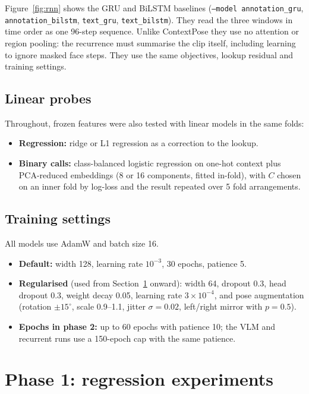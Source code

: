 \documentclass[11pt]{article}
\newcommand{\code}[1]{\texttt{#1}}
\begin{document}
Figure~\ref{fig:rnn} shows the GRU and BiLSTM baselines (\code{--model annotation\_gru}, \code{annotation\_bilstm}, \code{text\_gru}, \code{text\_bilstm}). They read the three windows in time order as one 96-step sequence. Unlike ContextPose they use no attention or region pooling: the recurrence must summarise the clip itself, including learning to ignore masked face steps. They use the same objectives, lookup residual and training settings.

\subsection{Linear probes}
Throughout, frozen features were also tested with linear models in the same folds:
\begin{itemize}
  \item \textbf{Regression:} ridge or L1 regression as a correction to the lookup.
  \item \textbf{Binary calls:} class-balanced logistic regression on one-hot context plus PCA-reduced embeddings (8 or 16 components, fitted in-fold), with $C$ chosen on an inner fold by log-loss and the result repeated over 5 fold arrangements.
\end{itemize}

\subsection{Training settings}
All models use AdamW and batch size 16.
\begin{itemize}
  \item \textbf{Default:} width 128, learning rate $10^{-3}$, 30 epochs, patience 5.
  \item \textbf{Regularised} (used from Section~\ref{sec:regression} onward): width 64, dropout 0.3, head dropout 0.3, weight decay 0.05, learning rate $3\times10^{-4}$, and pose augmentation (rotation $\pm15^\circ$, scale 0.9--1.1, jitter $\sigma=0.02$, left/right mirror with $p = 0.5$).
  \item \textbf{Epochs in phase 2:} up to 60 epochs with patience 10; the VLM and recurrent runs use a 150-epoch cap with the same patience.
\end{itemize}

\section{Phase 1: regression experiments}\label{sec:regression}
\end{document}
